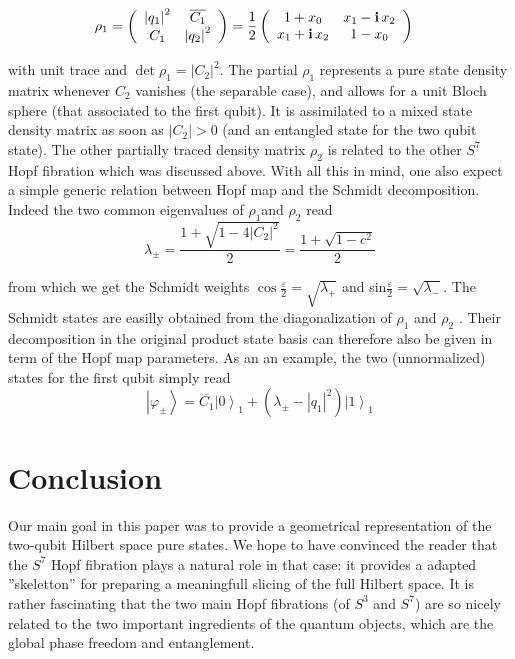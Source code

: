 \documentclass{amsart}
\begin{document}
\begin{equation}
\rho_{1}=\left(
\begin{array}
[c]{cc}%
\left|  q_{1}\right|  ^{2} & \overline{C_{1}}\\
C_{1} & \left|  q_{2}\right|  ^{2}%
\end{array}
\right)  =\frac{1}{2}\left(
\begin{array}
[c]{cc}%
1+x_{0} & x_{1}-\mathbf{i\,}x_{2}\\
x_{1}+\mathbf{i\,}x_{2} & 1-x_{0}%
\end{array}
\right)  \text{ \ }%
\end{equation}

with unit trace and $\det\rho_{1}=\left|  C_{2}\right|  ^{2}.$ The partial
$\rho_{1}$ represents a pure state density matrix whenever $C_{2}$ vanishes
(the separable case), and allows for a unit Bloch sphere (that associated to
the first qubit). It is assimilated to a mixed state density matrix as soon as
$\left|  C_{2}\right|  >0$ (and an entangled state for the two qubit state).
The other partially traced density matrix $\rho_{2}$ is related to the other
$S^{7}$ Hopf fibration which was discussed above. With all this in mind, one
also expect a simple generic relation between Hopf map and the Schmidt
decomposition. Indeed the two common eigenvalues of $\rho_{1}$and $\rho_{2}$
read%
\begin{equation}
\lambda_{\pm}=\frac{1+\sqrt{1-4\left|  C_{2}\right|  ^{2}}}{2}=\frac
{1+\sqrt{1-c^{2}}}{2}%
\end{equation}

from which we get the Schmidt weights $\cos\frac{\varepsilon}{2}=\sqrt
{\lambda_{+}}$ and sin$\frac{\varepsilon}{2}=\sqrt{\lambda_{-}}$. The Schmidt
states are easilly obtained from the diagonalization of $\rho_{1}$ and
$\rho_{2}$ . Their decomposition in the original product state basis can
therefore also be given in term of the Hopf map parameters. As an an example,
the two (unnormalized) states for the first qubit simply read%
\begin{equation}
\left|  \varphi_{\pm}\right\rangle =\overline{C_{1}}\left|  0\right\rangle
_{1}+\left(  \lambda_{\pm}-\left|  q_{1}\right|  ^{2}\right)  \left|
1\right\rangle _{1}%
\end{equation}

\section{Conclusion}

Our main goal in this paper was to provide a geometrical representation of the
two-qubit Hilbert space pure states. We hope to have convinced the reader that
the $S^{7}$ Hopf fibration plays a natural role in that case: it provides a
adapted ''skeletton'' for preparing a meaningfull slicing of the full Hilbert
space. It is rather fascinating that the two main Hopf fibrations (of $S^{3}$
and $S^{7}$) are so nicely related to the two important ingredients of the
quantum objects, which are the global phase freedom and entanglement.
\end{document}
